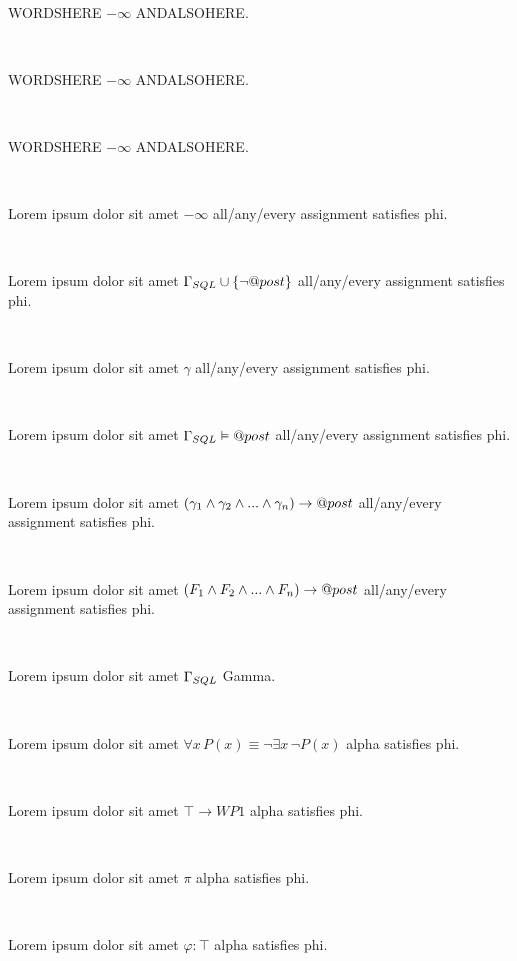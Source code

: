 \documentclass[12pt]{article}
\begin{document}
\centerline{~}

WORDSHERE $ - \infty $ ANDALSOHERE.

\centerline{~}

WORDSHERE $ - \infty $ ANDALSOHERE.

\centerline{~}

WORDSHERE $ - \infty $ ANDALSOHERE.



\centerline{~}

Lorem ipsum dolor sit amet $ - \infty $ all/any/every assignment satisfies phi.

\centerline{~}

Lorem ipsum dolor sit amet $ \Gamma_{\scriptsize SQL} \cup \{\neg @post\} $ all/any/every assignment satisfies phi.

\centerline{~}

Lorem ipsum dolor sit amet $ \gamma $ all/any/every assignment satisfies phi.

\centerline{~}

Lorem ipsum dolor sit amet $ \Gamma_{\scriptsize SQL} \vDash @post $ all/any/every assignment satisfies phi.

\centerline{~}

Lorem ipsum dolor sit amet $ ( \gamma_{\scriptsize 1} \wedge \gamma_{\scriptsize 2} \wedge ... \wedge \gamma_{\scriptsize n} ) \rightarrow @post $ all/any/every assignment satisfies phi.

\centerline{~}

Lorem ipsum dolor sit amet $ ( F_{\scriptsize 1} \wedge F_{\scriptsize 2} \wedge ... \wedge F_{\scriptsize n} ) \rightarrow @post $ all/any/every assignment satisfies phi.

\centerline{~}

Lorem ipsum dolor sit amet $ \Gamma_{\scriptsize SQL} $ Gamma.

\centerline{~}

Lorem ipsum dolor sit amet $ \forall x \, P(x) \equiv \neg \exists x \, \neg P(x)  $ alpha satisfies phi.

\centerline{~}

Lorem ipsum dolor sit amet $ \top \rightarrow WP1 $ alpha satisfies phi.

\centerline{~}

Lorem ipsum dolor sit amet $ \pi $ alpha satisfies phi.

\centerline{~}

Lorem ipsum dolor sit amet $ \varphi : \top $ alpha satisfies phi.
\end{document}
